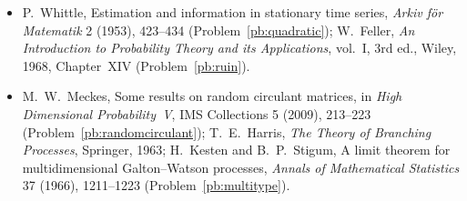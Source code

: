 \begin{itemize}
(Problems~\ref{pb:prediction} and~\ref{pb:levinson}).
\item P.~Whittle, Estimation and information in stationary time series, \emph{Arkiv för Matematik} 2 (1953), 423--434 (Problem~\ref{pb:quadratic}); W.~Feller, \emph{An Introduction to Probability Theory
and its Applications}, vol.~I, 3rd ed., Wiley, 1968, Chapter~XIV (Problem~\ref{pb:ruin}).
\item M.~W.~Meckes, Some results on random circulant matrices, in \emph{High Dimensional Probability~V}, IMS Collections 5 (2009), 213--223 (Problem~\ref{pb:randomcirculant}); T.~E.~Harris,
\emph{The Theory of Branching Processes}, Springer, 1963; H.~Kesten and B.~P.~Stigum, A limit theorem for multidimensional Galton--Watson processes, \emph{Annals of Mathematical Statistics} 37
(1966), 1211--1223 (Problem~\ref{pb:multitype}).
\end{itemize}
